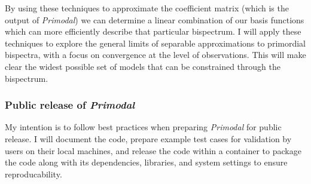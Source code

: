 By using these techniques to approximate the coefficient matrix (which is the output of \textit{Primodal})
we can determine a linear combination of our basis functions which can more efficiently
describe that particular bispectrum.
I will apply these techniques to explore the general limits of separable approximations to primordial bispectra,
with a focus on convergence at the level of observations. This will make clear the widest possible set
of models that can be constrained through the bispectrum.

\subsubsection{Public release of \textit{Primodal}}
My intention is to follow best practices when preparing \textit{Primodal} for
public release. I will document the code, prepare example test cases for validation by users
on their local machines,
and release the code within a container to package the code along with its
dependencies, libraries, and system settings to ensure reproducability.

